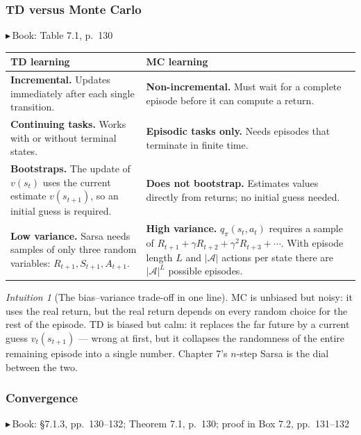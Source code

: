 \documentclass[11pt, letterpaper]{article}
\theoremstyle{runin}
\theoremstyle{runinplain}
\theoremstyle{remark}
\newtheorem*{intuition}{Intuition}
\newcommand{\Aspace}{\mathcal{A}}
\newcommand{\bk}[1]{{\color{bookblue}\small$\blacktriangleright$\,\textsf{Book: #1}}}
\begin{document}
\subsubsection{TD versus Monte Carlo}

\bk{Table 7.1, p.~130}

\begin{center}
\small
\begin{tabular}{@{}p{}p{}@{}}
\toprule
\textbf{TD learning} & \textbf{MC learning}\\
\midrule
\textbf{Incremental.} Updates immediately after each single transition.
& \textbf{Non-incremental.} Must wait for a complete episode before it can compute a return. \\[0.4em]
\textbf{Continuing tasks.} Works with or without terminal states.
& \textbf{Episodic tasks only.} Needs episodes that terminate in finite time. \\[0.4em]
\textbf{Bootstraps.} The update of $v(s_t)$ uses the current estimate $v(s_{t+1})$, so an initial guess is required.
& \textbf{Does not bootstrap.} Estimates values directly from returns; no initial guess needed. \\[0.4em]
\textbf{Low variance.} Sarsa needs samples of only three random variables: $R_{t+1},S_{t+1},A_{t+1}$.
& \textbf{High variance.} $q_\pi(s_t,a_t)$ requires a sample of $R_{t+1}+\gamma R_{t+2}+\gamma^2R_{t+3}+\cdots$. With episode length $L$ and $|\Aspace|$ actions per state there are $|\Aspace|^L$ possible episodes. \\
\bottomrule
\end{tabular}
\end{center}

\begin{intuition}[The bias--variance trade-off in one line]
MC is unbiased but noisy: it uses the real return, but the real return depends on
every random choice for the rest of the episode. TD is biased but calm: it replaces
the far future by a current guess $v_t(s_{t+1})$ --- wrong at first, but it collapses
the randomness of the entire remaining episode into a single number. Chapter 7's
$n$-step Sarsa is the dial between the two.
\end{intuition}

\subsubsection{Convergence}

\bk{\S7.1.3, pp.~130--132; Theorem 7.1, p.~130; proof in Box 7.2, pp.~131--132}
\end{document}
